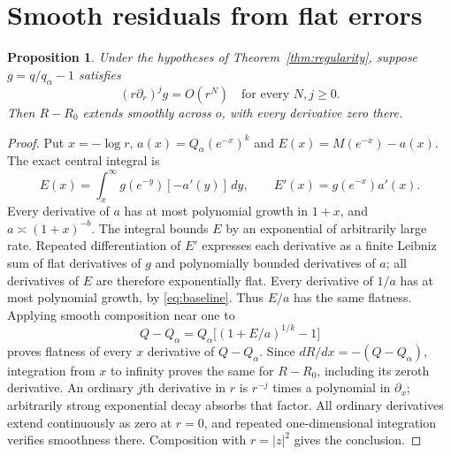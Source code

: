 \documentclass[11pt]{article}
\newtheorem{proposition}[theorem]{Proposition}
\theoremstyle{remark}\newtheorem{remark}[theorem]{Remark}
\begin{document}
\section{Smooth residuals from flat errors}
\begin{proposition}\label{prop:flat}
Under the hypotheses of Theorem~\ref{thm:regularity}, suppose
$g=q/q_\alpha-1$ satisfies
\[
 (r\partial_r)^jg=O(r^N)
 \quad\text{for every }N,j\ge0.
\]
Then $R-R_0$ extends smoothly across $o$, with every derivative
zero there.
\end{proposition}
\begin{proof}
Put $x=-\log r$, $a(x)=Q_\alpha(e^{-x})^k$ and
$E(x)=M(e^{-x})-a(x)$. The exact central integral is
\[
 E(x)=\int_x^\infty g(e^{-y})[-a'(y)]\,dy,
 \qquad E'(x)=g(e^{-x})a'(x).
\]
Every derivative of $a$ has at most polynomial growth in $1+x$,
and $a\asymp(1+x)^{-b}$. The integral bounds $E$ by an
exponential of arbitrarily large rate. Repeated differentiation of
$E'$ expresses each derivative as a finite Leibniz sum of flat
derivatives of $g$ and polynomially bounded derivatives of $a$;
all derivatives of $E$ are therefore exponentially flat.
Every derivative of $1/a$ has at most polynomial growth, by
\eqref{eq:baseline}. Thus $E/a$ has the same flatness. Applying
smooth composition near one to
\[
 Q-Q_\alpha=Q_\alpha\bigl[(1+E/a)^{1/k}-1\bigr]
\]
proves flatness of every $x$ derivative of $Q-Q_\alpha$.
Since $dR/dx=-(Q-Q_\alpha)$, integration from $x$ to infinity
proves the same for $R-R_0$, including its zeroth derivative.
An ordinary $j$th derivative in $r$ is $r^{-j}$ times a polynomial
in $\partial_x$; arbitrarily strong exponential decay absorbs that
factor. All ordinary derivatives extend continuously as zero at
$r=0$, and repeated one-dimensional integration verifies smoothness
there. Composition with $r=|z|^2$ gives the conclusion.
\end{proof}
\end{document}
